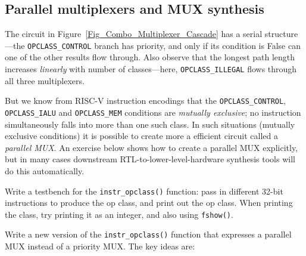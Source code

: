 
\subsection{Parallel multiplexers and MUX synthesis}

\label{Sec_MUXes}


The circuit in Figure~\ref{Fig_Combo_Multiplexer_Cascade} has a
serial structure---the \verb|OPCLASS_CONTROL| branch has priority, and
only if its condition is False can one of the other results flow
through.  Also observe that the longest path length increases
\emph{linearly} with number of classes---here, \verb|OPCLASS_ILLEGAL|
flows through all three multiplexers.

But we know from RISC-V instruction encodings that the
\verb|OPCLASS_CONTROL|, \verb|OPCLASS_IALU| and \verb|OPCLASS_MEM|
conditions are \emph{mutually exclusive}; no instruction
simultaneously falls into more than one such class.  In such
situations (mutually exclusive conditions) it is possible to create
more a efficient circuit called a \emph{parallel MUX}.  An exercise
below shows how to create a parallel MUX explicitly, but in many cases
downstream RTL-to-lower-level-hardware synthesis tools will do this
automatically.


\hdivider

\Exercise

Write a testbench for the \verb|instr_opclass()| function: pass in
different 32-bit instructions to produce the op class, and print out
the op class.  When printing the class, try printing it as an integer,
and also using \verb|fshow()|.

\Exercise

Write a new version of the \verb|instr_opclass()| function that
expresses a parallel MUX instead of a priority MUX.  The key ideas
are:

